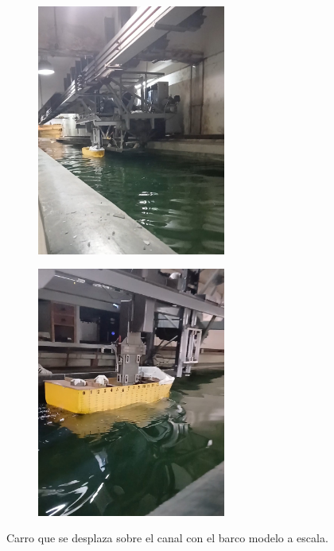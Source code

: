 \begin{figure}[!ht]
	\begin{minipage}[c]{0.5\textwidth}
			\begin{subfigure}{\textwidth}
					\centering
					\includegraphics[width=0.68\textwidth]{Figures/16_06_2025/Carro.jpg}
					\captionsetup{width=0.8\textwidth}
					\subcaption{}
				\end{subfigure}
		\end{minipage}\begin{minipage}[c]{0.49\textwidth}
			\begin{subfigure}{\textwidth}
					\centering
					\includegraphics[width=0.68\textwidth]{Figures/16_06_2025/Barco.jpg}
					\captionsetup{width=0.8\textwidth}
					\subcaption{}
				\end{subfigure}
		\end{minipage}
	\caption{Carro que se desplaza sobre el canal con el barco modelo a escala.}
	\label{fig:barco}
\end{figure}

